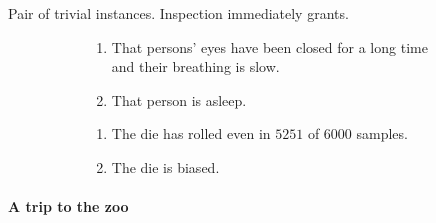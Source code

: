 \begin{note}
  Pair of trivial instances.
  Inspection immediately grants.
  \begin{illustration}
    \begin{figure}[h!]
    \mbox{}\hfill
    \begin{subfigure}{0.45\linewidth}
      \begin{enumerate}
      \item
        That persons' eyes have been closed for a long time and their breathing is slow.
      \item
        That person is asleep.
      \end{enumerate}
      \caption{}
    \end{subfigure}
    \hfill
    \begin{subfigure}{0.45\linewidth}
      \begin{enumerate}
      \item
        The die has rolled even in \(5251\) of \(6000\) samples.
      \item
        The die is biased.
      \end{enumerate}
      \caption{}
    \end{subfigure}
    \hfill\mbox{}
    \caption{}
    \label{fig:ideaS:basic-examples}
  \end{figure}
\end{illustration}
\end{note}


\paragraph{A trip to the zoo}

